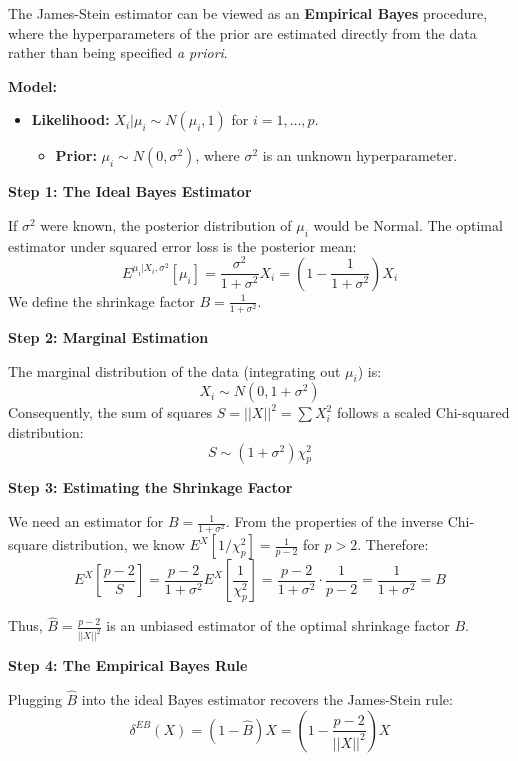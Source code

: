 \documentclass[
  letterpaper,
  DIV=11,
  numbers=noendperiod]{scrreprt}
\providecommand{\tightlist}{%
  \setlength{\itemsep}{0pt}\setlength{\parskip}{0pt}}
\renewcommand{\[}{\begin{equation}}
\renewcommand{\]}{\end{equation}}
\theoremstyle{definition}
\theoremstyle{plain}
\theoremstyle{plain}
\theoremstyle{plain}
\theoremstyle{definition}
\theoremstyle{plain}
\theoremstyle{remark}
\begin{document}
The James-Stein estimator can be viewed as an \textbf{Empirical Bayes}
procedure, where the hyperparameters of the prior are estimated directly
from the data rather than being specified \emph{a priori}.

\textbf{Model:}

\begin{itemize}
\tightlist
\item
  \textbf{Likelihood:} \(X_i | \mu_i \sim N(\mu_i, 1)\) for
  \(i=1, \dots, p\).

  \begin{itemize}
  \tightlist
  \item
    \textbf{Prior:} \(\mu_i \sim N(0, \sigma^2)\), where \(\sigma^2\) is
    an unknown hyperparameter.
  \end{itemize}
\end{itemize}

\textbf{Step 1: The Ideal Bayes Estimator}

If \(\sigma^2\) were known, the posterior distribution of \(\mu_i\)
would be Normal. The optimal estimator under squared error loss is the
posterior mean:
\[E^{\mu_i|X_i, \sigma^2}[\mu_i] = \frac{\sigma^2}{1+\sigma^2} X_i = \left( 1 - \frac{1}{1+\sigma^2} \right) X_i\]
We define the shrinkage factor \(B = \frac{1}{1+\sigma^2}\).

\textbf{Step 2: Marginal Estimation}

The marginal distribution of the data (integrating out \(\mu_i\)) is:
\[X_i \sim N(0, 1+\sigma^2)\] Consequently, the sum of squares
\(S = ||X||^2 = \sum X_i^2\) follows a scaled Chi-squared distribution:
\[S \sim (1+\sigma^2) \chi^2_p\]

\textbf{Step 3: Estimating the Shrinkage Factor}

We need an estimator for \(B = \frac{1}{1+\sigma^2}\). From the
properties of the inverse Chi-square distribution, we know
\(E^X[1/\chi^2_p] = \frac{1}{p-2}\) for \(p > 2\). Therefore:
\[E^X \left[ \frac{p-2}{S} \right] = \frac{p-2}{1+\sigma^2} E^X\left[\frac{1}{\chi^2_p}\right] = \frac{p-2}{1+\sigma^2} \cdot \frac{1}{p-2} = \frac{1}{1+\sigma^2} = B\]

Thus, \(\hat{B} = \frac{p-2}{||X||^2}\) is an unbiased estimator of the
optimal shrinkage factor \(B\).

\textbf{Step 4: The Empirical Bayes Rule}

Plugging \(\hat{B}\) into the ideal Bayes estimator recovers the
James-Stein rule:
\[\delta^{EB}(X) = \left( 1 - \hat{B} \right) X = \left( 1 - \frac{p-2}{||X||^2} \right) X\]
\end{document}
